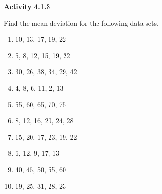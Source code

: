  \vspace{1ex}
\noindent\textbf{Activity 4.1.3}

\vspace{0.75ex}


Find the mean deviation for the following data sets.
\begin{multicols}{2}
\begin{enumerate}[noitemsep, label = \color{blue}\arabic*. ]
    \item 10, 13, 17, 19, 22
    \item 5, 8, 12, 15, 19, 22
    \item 30, 26, 38, 34, 29, 42
    \item 4, 8, 6, 11, 2, 13
    \item 55, 60, 65, 70, 75
    \item 8, 12, 16, 20, 24, 28
    \item 15, 20, 17, 23, 19, 22
    \item 6, 12, 9, 17, 13
    \item 40, 45, 50, 55, 60
    \item 19, 25, 31, 28, 23
\end{enumerate}
\end{multicols}
